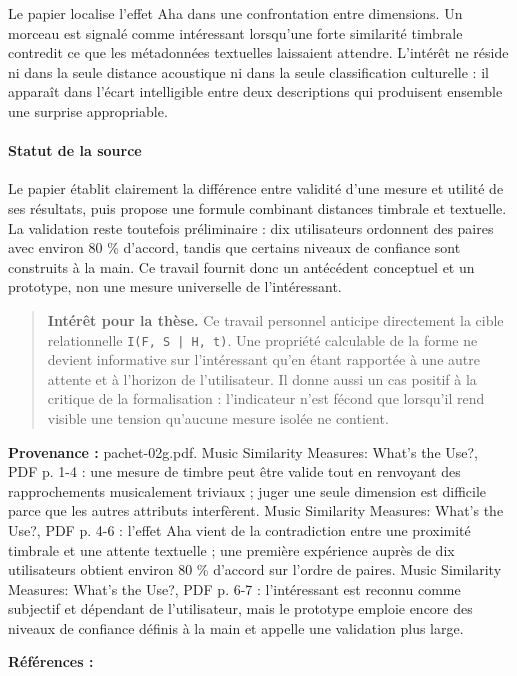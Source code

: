 \documentclass[10pt,a4paper]{article}
\begin{document}
Le papier localise l'effet Aha dans une confrontation entre dimensions. Un morceau est signalé comme intéressant lorsqu'une forte similarité timbrale contredit ce que les métadonnées textuelles laissaient attendre. L'intérêt ne réside ni dans la seule distance acoustique ni dans la seule classification culturelle : il apparaît dans l'écart intelligible entre deux descriptions qui produisent ensemble une surprise appropriable.

\paragraph{Statut de la source}
Le papier établit clairement la différence entre validité d'une mesure et utilité de ses résultats, puis propose une formule combinant distances timbrale et textuelle. La validation reste toutefois préliminaire : dix utilisateurs ordonnent des paires avec environ 80 \% d'accord, tandis que certains niveaux de confiance sont construits à la main. Ce travail fournit donc un antécédent conceptuel et un prototype, non une mesure universelle de l'intéressant.

\begin{quote}
\textbf{Intérêt pour la thèse.} Ce travail personnel anticipe directement la cible relationnelle \texttt{I(F, S | H, t)}. Une propriété calculable de la forme ne devient informative sur l'intéressant qu'en étant rapportée à une autre attente et à l'horizon de l'utilisateur. Il donne aussi un cas positif à la critique de la formalisation : l'indicateur n'est fécond que lorsqu'il rend visible une tension qu'aucune mesure isolée ne contient.
\end{quote}
{\footnotesize\color{metadata}\textbf{Provenance :} pachet-02g.pdf. Music Similarity Measures: What's the Use?, PDF p. 1-4 : une mesure de timbre peut être valide tout en renvoyant des rapprochements musicalement triviaux ; juger une seule dimension est difficile parce que les autres attributs interfèrent. Music Similarity Measures: What's the Use?, PDF p. 4-6 : l'effet Aha vient de la contradiction entre une proximité timbrale et une attente textuelle ; une première expérience auprès de dix utilisateurs obtient environ 80 \% d'accord sur l'ordre de paires. Music Similarity Measures: What's the Use?, PDF p. 6-7 : l'intéressant est reconnu comme subjectif et dépendant de l'utilisateur, mais le prototype emploie encore des niveaux de confiance définis à la main et appelle une validation plus large.\par}
{\footnotesize\color{metadata}\textbf{Références :} \parencite{aucouturier2002similarity}\par}
\end{document}
